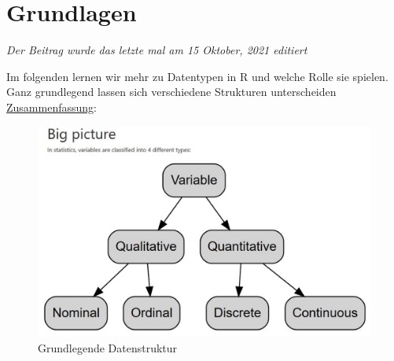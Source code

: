 \documentclass[
]{article}
\begin{document}
\hypertarget{grundlagen}{%
\section{Grundlagen}\label{grundlagen}}

\emph{Der Beitrag wurde das letzte mal am 15 Oktober, 2021 editiert}

Im folgenden lernen wir mehr zu Datentypen in R und welche Rolle sie spielen. Ganz grundlegend lassen sich verschiedene Strukturen unterscheiden \href{https://statsandr.com/blog/variable-types-and-examples/}{Zusammenfassung}:

\begin{figure}

{\centering \includegraphics[width=1\linewidth]{images/013a} 

}

\caption{Grundlegende Datenstruktur}\label{fig:unnamed-chunk-38}
\end{figure}
\end{document}

